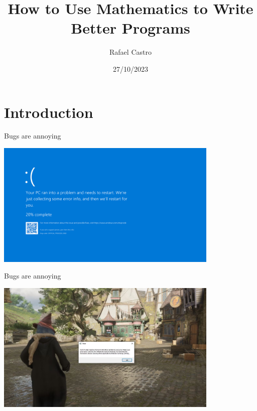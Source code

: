 \documentclass[presentation]{beamer}
\author{Rafael Castro}
\date{27/10/2023}
\title{How to Use Mathematics to Write Better Programs}
\begin{document}
\maketitle
\section{Introduction}
\label{sec:orga8a9892}
\begin{frame}[label={sec:org21ee3d2}]{Bugs are annoying}
\begin{center}
\includegraphics[width=0.8\textwidth]{./blue_screem_new.png}
\end{center}
\end{frame}
\begin{frame}[label={sec:orge856d8f}]{Bugs are annoying}
\begin{center}
\includegraphics[width=0.8\textwidth]{./harry.png}
\end{center}
\end{frame}
\end{document}
